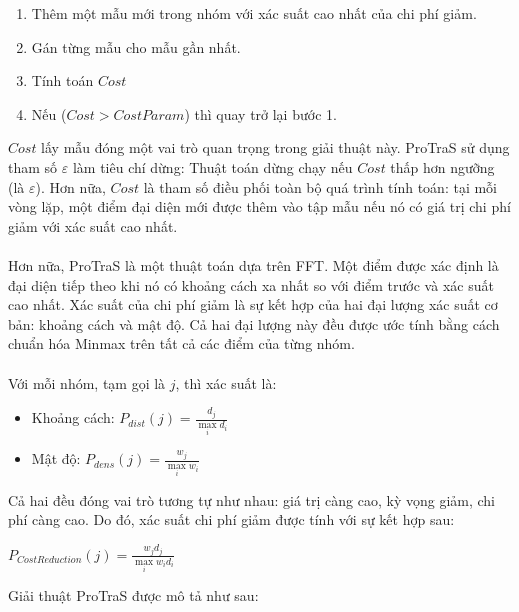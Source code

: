 \documentclass[a4paper, 12pt, oneside]{report}
\begin{document}
\begin{enumerate}
    \item Thêm một mẫu mới trong nhóm với xác suất cao nhất của chi phí giảm.
    \item Gán từng mẫu cho mẫu gần nhất.
    \item Tính toán $Cost$
    \item Nếu ($Cost > CostParam$) thì quay trở lại bước 1.
\end{enumerate}
$Cost$ lấy mẫu đóng một vai trò quan trọng trong giải thuật này. ProTraS sử dụng tham số $\varepsilon$ làm tiêu chí dừng: Thuật toán dừng chạy nếu $Cost$ thấp hơn ngưỡng (là $\varepsilon$). Hơn nữa, $Cost$ là tham số điều phối toàn bộ quá trình tính toán: tại mỗi vòng lặp, một điểm đại diện mới được thêm vào tập mẫu nếu nó có giá trị chi phí giảm với xác suất cao nhất.\\ \\
Hơn nữa, ProTraS là một thuật toán dựa trên FFT. Một điểm được xác định là đại diện tiếp theo khi nó có khoảng cách xa nhất so với điểm trước và xác suất cao nhất. Xác suất của chi phí giảm là sự kết hợp của hai đại lượng xác suất cơ bản: khoảng cách và mật độ. Cả hai đại lượng này đều được ước tính bằng cách chuẩn hóa Minmax trên tất cả các điểm của từng nhóm.\\ \\
Với mỗi nhóm, tạm gọi là $j$, thì xác suất là:
\begin{itemize}
    \item Khoảng cách: $P_{dist}\left ( j \right )= \frac{d_{j}}{\max\limits_{i} d_{i}}$
    \item Mật độ: $P_{dens}\left ( j \right )= \frac{w_{j}}{\max\limits_{i} w_{i}}$
\end{itemize}
Cả hai đều đóng vai trò tương tự như nhau: giá trị càng cao, kỳ vọng giảm, chi phí càng cao. Do đó, xác suất chi phí giảm được tính với sự kết hợp sau:
\begin{mybox}
\begin{center}
$P_{CostReduction}\left ( j \right )= \frac{w_{j}d_{j}}{\max\limits_{i} w_{i}d_{i}}$
\end{center}
\end{mybox}
Giải thuật ProTraS được mô tả như sau:
\end{document}
